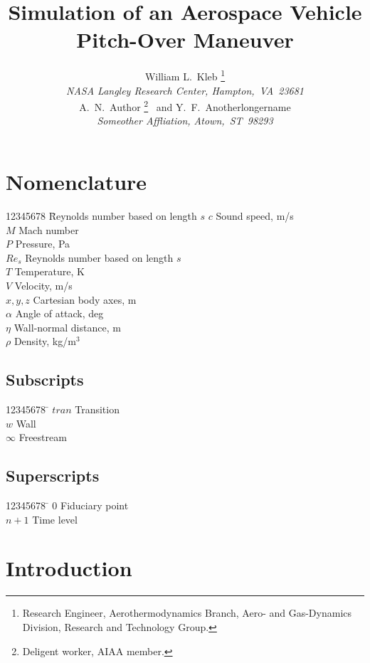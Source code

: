 \documentclass[cover]{aiaa}%
\title{Simulation of an Aerospace Vehicle \\
       Pitch-Over Maneuver}
\author{
%
William L.~Kleb%
%
  \thanks{Research Engineer, Aerothermodynamics Branch,
          Aero- and Gas-Dynamics Division,
          Research and Technology Group.} \\
%
         {\itshape NASA Langley Research Center,
                   Hampton,~VA~23681}\\[5pt]
%
A.~N.~Author%
%
  \thanks{Deligent worker,
          AIAA member.}
%
\ and Y.~F.~Anotherlongername%
%
  \thanksibid{2} \\ %
%
         {\itshape Someother Affliation,
         Atown,~ST~98293}
}
\begin{document}
\maketitle%

\section{Nomenclature}%

\begin{tabbing}
12345678 \= Reynolds number based on length $s$ \kill
$c$      \> Sound speed, m/s \\
$M$      \> Mach number \\
$P$      \> Pressure, Pa \\
$Re_s$   \> Reynolds number based on length $s$ \\
$T$      \> Temperature, K \\
$V$      \> Velocity, m/s \\
$x,y,z$  \> Cartesian body axes, m \\
$\alpha$ \> Angle of attack, deg \\
$\eta$   \> Wall-normal distance, m \\
$\rho$   \> Density, kg/m$^3$
\end{tabbing}

\subsection{Subscripts}
\begin{tabbing}
12345678 \= \kill
$tran$   \> Transition \\
$w$      \> Wall \\
$\infty$ \> Freestream
\end{tabbing}

\subsection{Superscripts}
\begin{tabbing}
12345678  \= \kill
$0$       \> Fiduciary point \\
$n\!+\!1$ \> Time level
\end{tabbing}

\section{Introduction}
\end{document}
